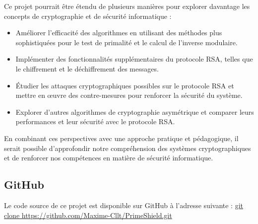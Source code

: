 \documentclass[11pt]{article}
\begin{document}
Ce projet pourrait être étendu de plusieurs manières pour explorer davantage les concepts de cryptographie et de sécurité informatique :

\begin{itemize}
\item Améliorer l'efficacité des algorithmes en utilisant des méthodes plus sophistiquées pour le test de primalité et le calcul de l'inverse modulaire.
\item Implémenter des fonctionnalités supplémentaires du protocole RSA, telles que le chiffrement et le déchiffrement des messages.
\item Étudier les attaques cryptographiques possibles sur le protocole RSA et mettre en œuvre des contre-mesures pour renforcer la sécurité du système.
\item Explorer d'autres algorithmes de cryptographie asymétrique et comparer leurs performances et leur sécurité avec le protocole RSA\@.
\end{itemize}

En combinant ces perspectives avec une approche pratique et pédagogique, il serait possible d'approfondir notre compréhension des systèmes cryptographiques et de renforcer nos compétences en matière de sécurité informatique.

\subsection{GitHub}\label{subsec:github}

Le code source de ce projet est disponible sur GitHub à l'adresse suivante : \url{git clone https://github.com/Maxime-Cllt/PrimeShield.git}
\end{document}
